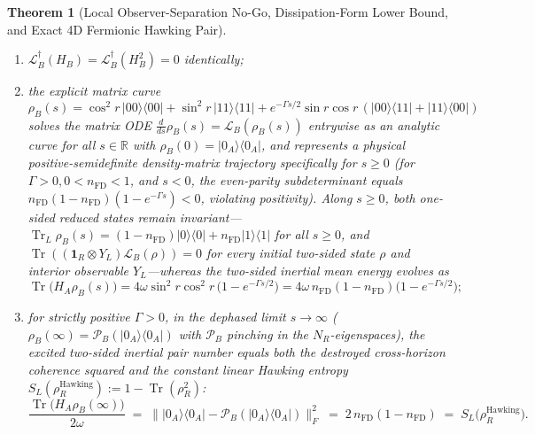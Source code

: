 \documentclass[11pt,a4paper]{article}
\newtheorem{theorem}{Theorem}
\theoremstyle{definition}
\theoremstyle{remark}
\newcommand{\Tr}{\operatorname{Tr}}
\newcommand{\cL}{\mathcal{L}}
\newcommand{\cP}{\mathcal{P}}
\newcommand{\bbR}{\mathbb{R}}
\newcommand{\1}{\mathbf{1}}
\newcommand{\normF}[1]{\|#1\|_F}
\begin{document}
\begin{theorem}[Local Observer-Separation No-Go, Dissipation-Form Lower Bound, and Exact 4D Fermionic Hawking Pair]
\begin{enumerate}
  \begin{enumerate}
    \item[(i)] $\cL_B^\dagger(H_B) = \cL_B^\dagger(H_B^2) = 0$ identically;
    \item[(ii)] the explicit matrix curve
    \[
      \rho_B(s) = \cos^2 r\,|00\rangle\langle 00| + \sin^2 r\,|11\rangle\langle 11| + e^{-\Gamma s/2}\sin r\cos r\,(|00\rangle\langle 11| + |11\rangle\langle 00|)
    \]
    solves the matrix ODE $\frac{d}{ds}\rho_B(s) = \cL_B(\rho_B(s))$ entrywise as an analytic curve for all $s \in \bbR$ with $\rho_B(0) = |0_A\rangle\langle 0_A|$, and represents a physical positive-semidefinite density-matrix trajectory specifically for $s \ge 0$ (for $\Gamma>0, 0<n_{\mathrm{FD}}<1$, and $s<0$, the even-parity subdeterminant equals $n_{\mathrm{FD}}(1-n_{\mathrm{FD}})(1-e^{-\Gamma s}) < 0$, violating positivity). Along $s\ge 0$, both one-sided reduced states remain invariant---$\Tr_L\rho_B(s) = (1-n_{\mathrm{FD}})|0\rangle\langle 0| + n_{\mathrm{FD}}|1\rangle\langle 1|$ for all $s\ge 0$, and $\Tr((\1_R\otimes Y_L)\cL_B(\rho)) = 0$ for every initial two-sided state $\rho$ and interior observable $Y_L$---whereas the two-sided inertial mean energy evolves as
    \begin{equation}\label{eq:ferm-energy-s}
      \Tr\bigl(H_A \rho_B(s)\bigr) = 4\omega\sin^2 r\cos^2 r\,\bigl(1 - e^{-\Gamma s/2}\bigr) = 4\omega\, n_{\mathrm{FD}}(1-n_{\mathrm{FD}})\bigl(1 - e^{-\Gamma s/2}\bigr);
    \end{equation}
    \item[(iii)] for strictly positive $\Gamma > 0$, in the dephased limit $s \to \infty$ ($\rho_B(\infty) = \cP_B(|0_A\rangle\langle 0_A|)$ with $\cP_B$ pinching in the $N_R$-eigenspaces), the excited two-sided inertial pair number equals both the destroyed cross-horizon coherence squared and the constant linear Hawking entropy $S_L(\rho_R^{\mathrm{Hawking}}) := 1 - \Tr(\rho_R^2)$:
    \begin{equation}\label{eq:firewall-entropy}
      \frac{\Tr\bigl(H_A \rho_B(\infty)\bigr)}{2\omega}
      \;=\; \normF{|0_A\rangle\langle 0_A| - \cP_B(|0_A\rangle\langle 0_A|)}^2
      \;=\; 2\,n_{\mathrm{FD}}(1-n_{\mathrm{FD}})
      \;=\; S_L\bigl(\rho_R^{\mathrm{Hawking}}\bigr).
    \end{equation}
  \end{enumerate}
\end{enumerate}
\end{theorem}
\end{document}
